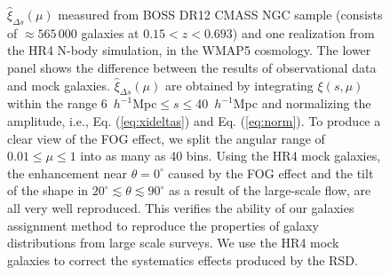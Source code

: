 \documentclass[iop]{emulateapj}
\begin{document}
\begin{figure}
   \caption{\label{fig_datamock}
   $\hat\xi_{\Delta s}(\mu)$ measured from BOSS DR12 CMASS NGC sample 
    (consists of $\approx 565\,000$ galaxies at $0.15 < z < 0.693$)
    and one realization from the HR4 N-body simulation, in the WMAP5 cosmology.
   The lower panel shows the difference between the results of observational data and mock galaxies.
   $\hat\xi_{\Delta s}(\mu)$ are obtained by integrating $\xi (s,\mu)$ within the range {\rm 6\ $h^{-1}$Mpc}$\leq s\leq${\rm 40\ $h^{-1}$Mpc} 
      and normalizing the amplitude, 
    i.e., Eq. (\ref{eq:xideltas}) and Eq. (\ref{eq:norm}).
   To produce a clear view of the FOG effect, we split the angular range of $0.01\leq \mu \leq 1$ into as many as 40 bins.
   Using the HR4 mock galaxies, the enhancement near $\theta=0^\circ$ caused by the FOG effect
    and the tilt of the shape in $20^\circ\lesssim\theta\lesssim90^\circ$ 
    as a result of the large-scale flow,
    are all very well reproduced.
   This verifies the ability of our galaxies assignment method \citep{hong2016} 
    to reproduce the properties of galaxy distributions from large scale surveys.
   We use the HR4 mock galaxies to correct the systematics effects produced by the RSD.
   }
\end{figure}
\end{document}
